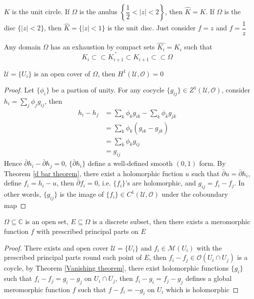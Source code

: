 \documentclass[../main.tex]{subfiles}
\begin{document}
\begin{example}
$K$ is the unit circle. If $\Omega$ is the anulus $\left\{\dfrac{1}{2}<|z|<2\right\}$, then $\hat K=K$. If $\Omega$ is the disc $\{|z|<2\}$, then $\hat K=\{|z|<1\}$ is the unit disc. Just consider $f=z$ and $f=\dfrac{1}{z}$
\end{example}

\begin{corollary}\label{Compact exhaustion of a domain}
Any domain $\Omega$ has an exhaustion by compact sets $\hat{K_i}=K_i$ such that
\[K_i\subset\subset \overset{\circ}{K_{i+1}}\subset K_{i+1}\subset\subset\Omega\]
\end{corollary}

\begin{theorem}\label{Vanishing theorem}
$\mathcal U=\{U_i\}$ is an open cover of $\Omega$, then $H^1(\mathcal U,\mathcal O)=0$
\end{theorem}

\begin{proof}
Let $\{\phi_i\}$ be a partion of unity. For any cocycle $\{g_{ij}\}\in Z^1(\mathcal U,\mathcal O)$, consider $h_i=\displaystyle\sum_j\phi_jg_{ij}$, then
\begin{align*}
h_i-h_j&=\sum_k\phi_kg_{ik}-\sum_k\phi_kg_{jk} \\
&=\sum_k\phi_k(g_{ik}-g_{jk}) \\
&=\sum_k\phi_kg_{ij} \\
&=g_{ij}
\end{align*}
Hence $\bar\partial h_i-\bar\partial h_j=0$, $\{\bar\partial h_i\}$ define a well-defined smooth $(0,1)$ form. By Theorem \ref{d bar theorem}, there exist a holomorphic fuction $u$ such that $\bar\partial u=\bar\partial h_i$, define $f_i=h_i-u$, then $\bar\partial f_i=0$, i.e. $\{f_i\}$'s are holomorphic, and $g_{ij}=f_i-f_j$. In other words, $\{g_{ij}\}$ is the image of $\{f_i\}\in C^1(\mathcal U,\mathcal O)$ under the coboundary map
\end{proof}

\begin{theorem}
$\Omega\subseteq\mathbb C$ is an open set, $E\subseteq\Omega$ is a discrete subset, then there exists a meromorphic function $f$ with prescribed principal parts on $E$
\end{theorem}

\begin{proof}
There exists and open cover $\mathcal U=\{U_i\}$ and $f_i\in\mathcal M(U_i)$ with the prescribed principal parts round each point of $E$, then $f_i-f_j\in\mathcal O(U_i\cap U_j)$ is a coycle, by Theorem \ref{Vanishing theorem}, there exist holomorphic functions $\{g_i\}$ such that $f_i-f_j=g_i-g_j$ on $U_i\cap U_j$, then $f_i-g_i=f_j-g_j$ defines a global meromorphic function $f$ such that $f-f_i=-g_i$ on $U_i$ which is holomorphic
\end{proof}
\end{document}
